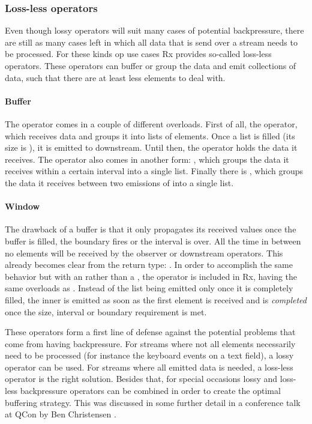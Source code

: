 \subsubsection{Loss-less operators}
Even though lossy operators will suit many cases of potential backpressure, there are still as many cases left in which all data that is send over a stream needs to be processed. For these kinds op use cases Rx provides so-called loss-less operators. These operators can buffer or group the data and emit collections of data, such that there are at least less elements to deal with.

\paragraph{Buffer} The  operator comes in a couple of different overloads. First of all, the  operator, which receives data and groups it into lists of  elements. Once a list is filled (its size is ), it is emitted to downstream. Until then, the operator holds the data it receives. The  operator also comes in another form: , which groups the data it receives within a certain interval into a single list. Finally there is , which groups the data it receives between two emissions of  into a single list.

\paragraph{Window} The drawback of a buffer is that it only propagates its received values once the buffer is filled, the boundary \obs fires or the interval is over. All the time in between no elements will be received by the observer or downstream operators. This already becomes clear from the return type: . In order to accomplish the same behavior but with an \obs rather than a , the  operator is included in Rx, having the same overloads as . Instead of the list being emitted only once it is completely filled, the inner \obs is emitted as soon as the first element is received and is \emph{completed} once the size, interval or boundary requirement is met.

These operators form a first line of defense against the potential problems that come from having backpressure. For streams where not all elements necessarily need to be processed (for instance the keyboard events on a text field), a lossy operator can be used. For streams where all emitted data is needed, a loss-less operator is the right solution. Besides that, for special occasions lossy and loss-less backpressure operators can be combined in order to create the optimal buffering strategy. This was discussed in some further detail in a conference talk at QCon by Ben Christensen .

